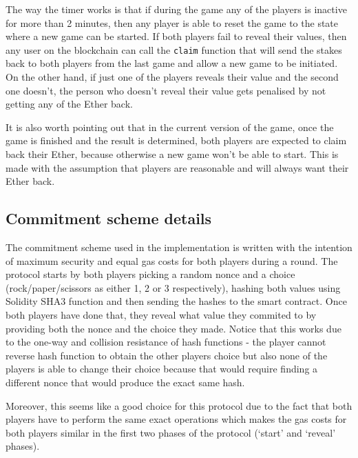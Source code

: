 \documentclass{article}
\begin{document}
    \noindent The way the timer works is that if during the
    game any of the players is inactive for more than 2
    minutes, then any player is able to reset the game to
    the state where a new game can be started. If both
    players fail to reveal their values, then any user on
    the blockchain can call the \verb|claim| function that
    will send the stakes back to both players from the last
    game and allow a new game to be initiated. On the other
    hand, if just one of the players reveals their value and
    the second one doesn't, the person who doesn't reveal
    their value gets penalised by not getting any of the
    Ether back.
    \newline

    \noindent It is also worth pointing out that in the
    current version of the game, once the game is finished
    and the result is determined, both players are expected
    to claim back their Ether, because otherwise a new game
    won't be able to start. This is made with the assumption
    that players are reasonable and will always want their
    Ether back.

    \subsection{Commitment scheme details} \label{s:scheme}
    The commitment scheme used in the implementation is
    written with the intention of maximum security and equal
    gas costs for both players during a round. The protocol
    starts by both players picking a random nonce and a
    choice (rock/paper/scissors as either 1, 2 or 3
    respectively), hashing both values using Solidity SHA3
    function and then sending the hashes to the smart
    contract. Once both players have done that, they reveal
    what value they commited to by providing both the nonce
    and the choice they made. Notice that this works due to
    the one-way and collision resistance of hash functions -
    the player cannot reverse hash function to obtain the
    other players choice but also none of the players is
    able to change their choice because that would require
    finding a different nonce that would produce the exact
    same hash.
    \newline

    \noindent Moreover, this seems like a good choice for
    this protocol due to the fact that both players have to
    perform the same exact operations which makes the gas
    costs for both players similar in the first two phases
    of the protocol (`start' and `reveal' phases).
    \newline
\end{document}
